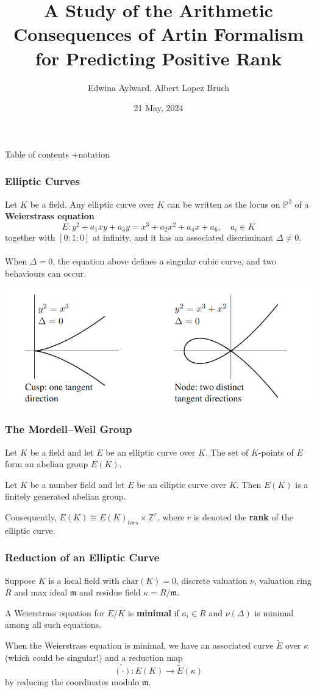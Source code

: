 \documentclass{beamer}
\title[Artin Formalism]{A Study of the Arithmetic Consequences of Artin Formalism for
Predicting Positive Rank}
\author{Edwina Aylward, Albert Lopez Bruch}
\date{21 May, 2024}
\newcommand{\ZZ}{\mathbb{Z}}
\theoremstyle{plain}
\begin{document}
\frame{\titlepage}

\begin{frame}{Table of contents}
    +notation
\end{frame}

\begin{frame}
    \frametitle{Elliptic Curves}
    Let $K$ be a field. Any elliptic curve over $K$ can be written as the locus on $\mathbb{P}^2$ of a \textbf{Weierstrass equation}
    \begin{equation}
        E:y^2+a_1xy+a_3y=x^3+a_2x^2+a_4x+a_6,\quad a_i\in K
    \end{equation}
    together with $[0:1:0]$ at infinity, and it has an associated discriminant $\Delta\neq0$. \pause
    \\~\\
    When $\Delta=0$, the equation above defines a singular cubic curve, and two behaviours can occur.
    
    \centering
    \includegraphics[scale=0.4]{Singular_cubic.png}
\end{frame}

\begin{frame}
    \frametitle{The Mordell--Weil Group}
    Let $K$ be a field and let $E$ be an elliptic curve over $K$. The set of $K$-points of $E$ form an abelian group $E(K)$. \pause
    \begin{theorem}
        Let $K$ be a number field and let $E$ be an elliptic curve over $K$. Then $E(K)$ is a finitely generated abelian group.
    \end{theorem} \pause
    Consequently, $E(K)\cong E(K)_{tors}\times\ZZ^r$, where $r$ is denoted the \textbf{rank} of the elliptic curve.

\end{frame}

\begin{frame}
    \frametitle{Reduction of an Elliptic Curve}
    Suppose $K$ is a local field with $\mathrm{char}(K)=0$, discrete valuation $\nu$, valuation ring $R$ and max ideal $\mathfrak{m}$ and residue field $\kappa=R/\mathfrak{m}$. \pause
    \begin{definition}
        A Weierstrass equation for $E/K$ is \textbf{minimal} if $a_i\in R$ and $\nu(\Delta)$ is minimal among all such equations.
    \end{definition} \pause
    When the Weierstrass equation is minimal, we have an associated curve $\tilde{E}$ over $\kappa$ (which could be singular!) and a reduction map 
    $$\widetilde{(\cdot)}:E(K)\longrightarrow \tilde{E}(\kappa)$$
    by reducing the coordinates modulo $\mathfrak{m}$.
\end{frame}
\end{document}
